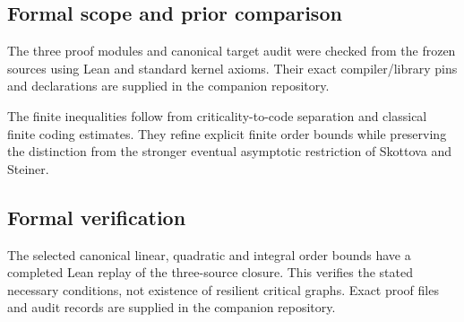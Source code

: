 \documentclass[11pt,a4paper]{article}
\begin{document}
\subsection{Formal scope and prior comparison}
The three proof modules and canonical target audit were checked from the frozen sources using Lean and standard kernel axioms. Their exact compiler/library pins and declarations are supplied in the companion repository.

The finite inequalities follow from criticality-to-code separation and classical finite coding estimates. They refine explicit finite order bounds while preserving the distinction from the stronger eventual asymptotic restriction of Skottova and Steiner.

\subsection{Formal verification}
The selected canonical linear, quadratic and integral order bounds have a completed Lean replay of the three-source closure. This verifies the stated necessary conditions, not existence of resilient critical graphs. Exact proof files and audit records are supplied in the companion repository.
\end{document}
